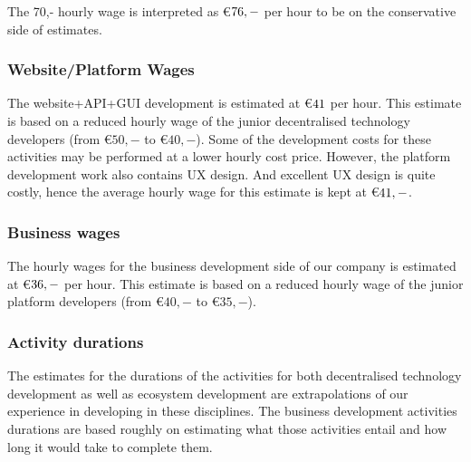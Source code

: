 The 70,- hourly wage is interpreted as \euro$76,-$ per hour to be on the conservative side of estimates.
\subsubsection{Website/Platform Wages}
The website+API+GUI development is estimated at \euro$41$ per hour. This estimate is based on a reduced hourly wage of the junior decentralised technology developers (from \euro$50,-$ to \euro$40,-$). Some of the development costs for these activities may be performed at a lower hourly cost price. However, the platform development work also contains UX design. And excellent UX design is quite costly, hence the average hourly wage for this estimate is kept at \euro$41,-$.

\subsubsection{Business wages}
The hourly wages for the business development side of our company is estimated at \euro$36,-$ per hour. This estimate is based on a reduced hourly wage of the junior platform developers (from \euro$40,-$ to \euro$35,-$).

\subsubsection{Activity durations}
The estimates for the durations of the activities for both decentralised technology development as well as ecosystem development are extrapolations of our experience in developing in these disciplines. The business development activities durations are based roughly on estimating what those activities entail and how long it would take to complete them.
